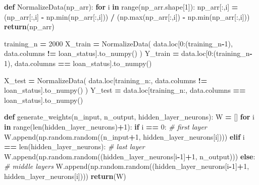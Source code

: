 \documentclass[
]{book}
\newenvironment{Shaded}{\begin{snugshade}}{\end{snugshade}}
\newcommand{\BuiltInTok}[1]{#1}
\newcommand{\CommentTok}[1]{\textcolor[rgb]{0.56,0.35,0.01}{\textit{#1}}}
\newcommand{\ControlFlowTok}[1]{\textcolor[rgb]{0.13,0.29,0.53}{\textbf{#1}}}
\newcommand{\DecValTok}[1]{\textcolor[rgb]{0.00,0.00,0.81}{#1}}
\newcommand{\KeywordTok}[1]{\textcolor[rgb]{0.13,0.29,0.53}{\textbf{#1}}}
\newcommand{\NormalTok}[1]{#1}
\newcommand{\OperatorTok}[1]{\textcolor[rgb]{0.81,0.36,0.00}{\textbf{#1}}}
\newcommand{\StringTok}[1]{\textcolor[rgb]{0.31,0.60,0.02}{#1}}
\begin{document}
\begin{Shaded}
\begin{Highlighting}[]
\KeywordTok{def}\NormalTok{ NormalizeData(np\_arr):}
  \ControlFlowTok{for}\NormalTok{ i }\KeywordTok{in} \BuiltInTok{range}\NormalTok{(np\_arr.shape[}\DecValTok{1}\NormalTok{]):}
\NormalTok{    np\_arr[:,i] }\OperatorTok{=}\NormalTok{ (np\_arr[:,i] }\OperatorTok{{-}}\NormalTok{ np.}\BuiltInTok{min}\NormalTok{(np\_arr[:,i])) }\OperatorTok{/}\NormalTok{ (np.}\BuiltInTok{max}\NormalTok{(np\_arr[:,i]) }\OperatorTok{{-}}\NormalTok{ np.}\BuiltInTok{min}\NormalTok{(np\_arr[:,i]))}
  \ControlFlowTok{return}\NormalTok{(np\_arr)}

\NormalTok{training\_n }\OperatorTok{=} \DecValTok{2000}
\NormalTok{X\_train }\OperatorTok{=}\NormalTok{ NormalizeData( data.loc[}\DecValTok{0}\NormalTok{:(training\_n}\OperatorTok{{-}}\DecValTok{1}\NormalTok{), data.columns }\OperatorTok{!=} \StringTok{\textquotesingle{}loan\_status\textquotesingle{}}\NormalTok{].to\_numpy() )}
\NormalTok{Y\_train }\OperatorTok{=}\NormalTok{ data.loc[}\DecValTok{0}\NormalTok{:(training\_n}\OperatorTok{{-}}\DecValTok{1}\NormalTok{), data.columns }\OperatorTok{==} \StringTok{\textquotesingle{}loan\_status\textquotesingle{}}\NormalTok{].to\_numpy()}

\NormalTok{X\_test }\OperatorTok{=}\NormalTok{ NormalizeData( data.loc[training\_n:, data.columns }\OperatorTok{!=} \StringTok{\textquotesingle{}loan\_status\textquotesingle{}}\NormalTok{].to\_numpy() )}
\NormalTok{Y\_test }\OperatorTok{=}\NormalTok{ data.loc[training\_n:, data.columns }\OperatorTok{==} \StringTok{\textquotesingle{}loan\_status\textquotesingle{}}\NormalTok{].to\_numpy()}



\KeywordTok{def}\NormalTok{ generate\_weights(n\_input, n\_output, hidden\_layer\_neurons):}
\NormalTok{  W }\OperatorTok{=}\NormalTok{ []}
  \ControlFlowTok{for}\NormalTok{ i }\KeywordTok{in} \BuiltInTok{range}\NormalTok{(}\BuiltInTok{len}\NormalTok{(hidden\_layer\_neurons)}\OperatorTok{+}\DecValTok{1}\NormalTok{):}
    \ControlFlowTok{if}\NormalTok{ i }\OperatorTok{==} \DecValTok{0}\NormalTok{: }\CommentTok{\# first layer}
\NormalTok{      W.append(np.random.random((n\_input}\OperatorTok{+}\DecValTok{1}\NormalTok{, hidden\_layer\_neurons[i])))}
    \ControlFlowTok{elif}\NormalTok{ i }\OperatorTok{==} \BuiltInTok{len}\NormalTok{(hidden\_layer\_neurons): }\CommentTok{\# last layer}
\NormalTok{      W.append(np.random.random((hidden\_layer\_neurons[i}\OperatorTok{{-}}\DecValTok{1}\NormalTok{]}\OperatorTok{+}\DecValTok{1}\NormalTok{, n\_output)))}
    \ControlFlowTok{else}\NormalTok{: }\CommentTok{\# middle layers}
\NormalTok{      W.append(np.random.random((hidden\_layer\_neurons[i}\OperatorTok{{-}}\DecValTok{1}\NormalTok{]}\OperatorTok{+}\DecValTok{1}\NormalTok{, hidden\_layer\_neurons[i])))}
  \ControlFlowTok{return}\NormalTok{(W)}


\end{Highlighting}
\end{Shaded}
\end{document}
